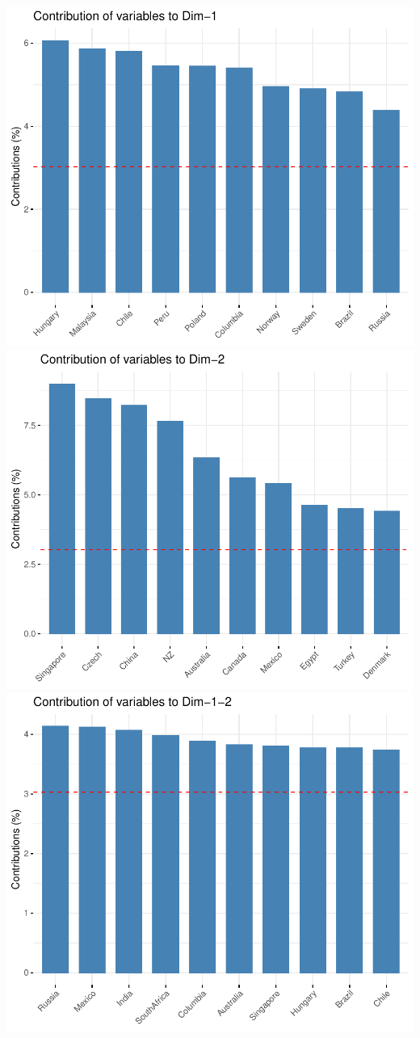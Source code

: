 \documentclass[11pt,preprint, authoryear]{elsarticle}
\numberwithin{equation}{section}
\numberwithin{figure}{section}
\numberwithin{table}{section}
\begin{document}
\includegraphics{Essay_files/figure-latex/unnamed-chunk-3-4.pdf}
\includegraphics{Essay_files/figure-latex/unnamed-chunk-3-5.pdf}
\includegraphics{Essay_files/figure-latex/unnamed-chunk-3-6.pdf}
\end{document}
